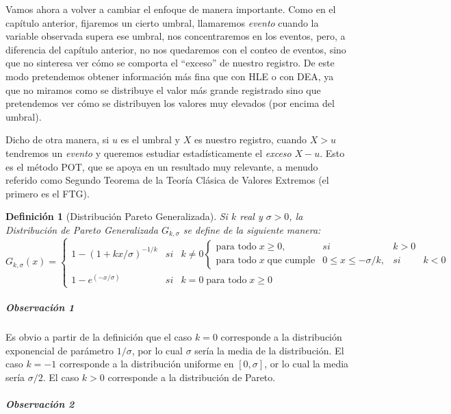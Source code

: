 \documentclass[
  12pt]{article}
\newtheorem{definition}{Definición}[section]
\begin{document}
Vamos ahora a volver a cambiar el enfoque de manera importante. Como en
el capítulo anterior, fijaremos un cierto umbral, llamaremos
\emph{evento} cuando la variable observada supera ese umbral, nos
concentraremos en los eventos, pero, a diferencia del capítulo anterior,
no nos quedaremos con el conteo de eventos, sino que no sinteresa ver
cómo se comporta el ``exceso'' de nuestro registro. De este modo
pretendemos obtener información más fina que con HLE o con DEA, ya que
no miramos como se distribuye el valor más grande registrado sino que
pretendemos ver cómo se distribuyen los valores muy elevados (por encima
del umbral).

Dicho de otra manera, si \(u\) es el umbral y \(X\) es nuestro registro,
cuando \(X>u\) tendremos un \emph{evento} y queremos estudiar
estadísticamente el \emph{exceso} \(X-u\). Esto es el método POT, que se
apoya en un resultado muy relevante, a menudo referido como Segundo
Teorema de la Teoría Clásica de Valores Extremos (el primero es el FTG).

\begin{definition}[Distribución Pareto Generalizada]
Si $k$ real y $\sigma>0$, la Distribución de Pareto Generalizada $G_{k,\sigma}$ se define de la siguiente manera:\\
\begin{equation}
G_{k,\sigma}(x)=\left\{\begin{matrix}
 1-(1+kx/\sigma)^{-1/k}& si & k\neq 0 \left\{\begin{matrix}
\text{para todo} \;x\geq 0 , & si & k>0\\ 
\text{para todo}\; x \;\text{que cumple}&
0\leq x \leq  -\sigma/k, &si& k<0
\end{matrix}\right.\\ 
 1-e^{(-x/\sigma)} & si& k =0\; \text{para todo}\; x\geq 0
\end{matrix}\right. 
\end{equation}
\end{definition}

\subparagraph{Observación 1}\label{observaciuxf3n-1}

Es obvio a partir de la definición que el caso \(k=0\) corresponde a la
distribución exponencial de parámetro \(1/\sigma\), por lo cual
\(\sigma\) sería la media de la distribución. El caso \(k=-1\)
corresponde a la distribución uniforme en \([0, \sigma]\), or lo cual la
media sería \(\sigma/2\). El caso \(k>0\) corresponde a la distribución
de Pareto.

\subparagraph{Observación 2}\label{observaciuxf3n-2}
\end{document}
